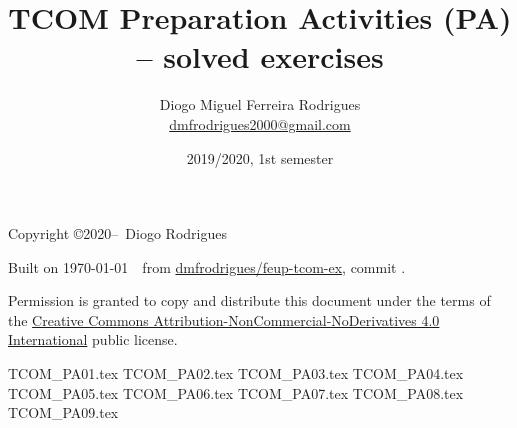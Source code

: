 \documentclass{tcom}
\title{TCOM Preparation Activities (PA) -- solved exercises}
\author{Diogo Miguel Ferreira Rodrigues \\ \href{mailto:dmfrodrigues2000@gmail.com}{dmfrodrigues2000@gmail.com}}
\date{2019/2020, 1st semester}
\begin{document}
\maketitle
\begin{secondpage}
    Copyright \copyright 2020--\the\year\ Diogo Rodrigues\par
    \par
    \immediate{}
    Built on \today~\currenttime~from \href{https://github.com/dmfrodrigues/feup-tcom-ex}{dmfrodrigues/feup-tcom-ex}, commit \unskip.\par
    Permission is granted to copy and distribute this document under the terms of the
    \href{https://creativecommons.org/licenses/by-nc-nd/4.0/}{Creative Commons Attribution-NonCommercial-NoDerivatives 4.0 International}
    public license.
\end{secondpage}
\frontmatter
\tableofcontents
\mainmatter
{TCOM_PA01.tex}
{TCOM_PA02.tex}
{TCOM_PA03.tex}
{TCOM_PA04.tex}
{TCOM_PA05.tex}
{TCOM_PA06.tex}
{TCOM_PA07.tex}
{TCOM_PA08.tex}
{TCOM_PA09.tex}
\end{document}
